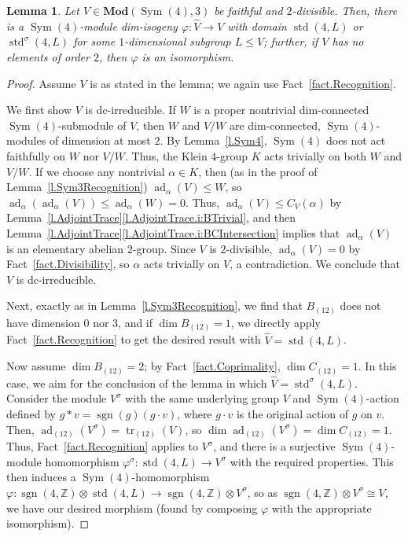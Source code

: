 \documentclass[a4paper, 11pt]{amsart}
\theoremstyle{plain}
\newtheorem{lemma}[theorem]{Lemma}
\theoremstyle{definition}
\theoremstyle{remark}
\DeclareMathOperator{\ad}{ad}
\DeclareMathOperator{\tr}{tr}
\DeclareMathOperator{\Sym}{Sym}
\DeclareMathOperator{\std}{std}
\DeclareMathOperator{\sgn}{sgn}
\newcommand{\Mod}{\mathbf{Mod}}
\newcommand{\bZ}{\mathbb{Z}}
\begin{document}
\begin{lemma}\label{l.Sym4Recognition}
Let $V\in \Mod(\Sym(4),3)$ be faithful and $2$-divisible. Then, there is a $\Sym(4)$-module dim-isogeny  $\varphi:\hat V\rightarrow V$ with domain $\std(4,L)$ or $\std^\sigma(4,L)$ for some $1$-dimensional subgroup $L\le V$;  further, if $V$ has no elements of order $2$, then $\varphi$ is an isomorphism.
\end{lemma}
\begin{proof}
Assume $V$ is as stated in the lemma; we again use Fact~\ref{fact.Recognition}.

We first  show  $V$ is dc-irreducible. If $W$ is a proper nontrivial dim-connected $\Sym(4)$-submodule of $V$, then $W$ and $V/W$ are dim-connected, $\Sym(4)$-modules of dimension at most $2$. By Lemma~\ref{l.Sym4}, $\Sym(4)$ does not act faithfully on $W$ nor $V/W$. Thus, the Klein $4$-group $K$ acts trivially on both $W$ and $V/W$. If we choose any nontrivial $\alpha \in K$, then (as in the proof of Lemma~\ref{l.Sym3Recognition}) $\ad_\alpha(V) \le W$, so   $\ad_\alpha(\ad_\alpha(V)) \le\ad_\alpha(W) =0$. Thus, $\ad_\alpha(V) \le C_V(\alpha)$ by Lemma~\ref{l.AdjointTrace}\eqref{l.AdjointTrace.i:BTrivial}, and then Lemma~\ref{l.AdjointTrace}\eqref{l.AdjointTrace.i:BCIntersection} implies that $\ad_\alpha(V)$ is an elementary abelian $2$-group. Since $V$ is $2$-divisible, $\ad_\alpha(V)=0$ by Fact~\ref{fact.Divisibility}, so $\alpha$ acts trivially on $V$, a contradiction. We conclude that $V$ is dc-irreducible.

Next, exactly as in  Lemma~\ref{l.Sym3Recognition}, we find that $B_{(12)}$ does not have dimension $0$ nor $3$, and if $\dim B_{(12)} = 1$, we directly apply Fact~\ref{fact.Recognition} to get the desired result with $\hat V=\std(4,L)$. 

Now assume $\dim B_{(12)} = 2$; by Fact~\ref{fact.Coprimality},  $\dim C_{(12)} = 1$. In this case, we aim for the conclusion of the lemma in which $\hat V=\std^\sigma(4,L)$.
Consider the module $V^\sigma$ with the same underlying group $V$ and $\Sym(4)$-action defined by $g*v = \sgn(g)(g\cdot v)$, where $g\cdot v$ is the original action of $g$ on $v$. Then, $\ad_{(12)}(V^\sigma) = \tr_{(12)}(V)$, so $\dim \ad_{(12)}(V^\sigma) = \dim C_{(12)} = 1$. Thus, Fact~\ref{fact.Recognition} applies to $V^\sigma$, and there is  a surjective $\Sym(4)$-module homomorphism $\varphi^\sigma:\std(4,L)\rightarrow V^\sigma$ with the required properties. This then induces a $\Sym(4)$-homomorphism $\varphi:\sgn(4,\bZ)\otimes\std(4,L)\rightarrow \sgn(4,\bZ)\otimes V^\sigma$, so as $\sgn(4,\bZ)\otimes V^\sigma \cong V$, we have our desired morphism (found by composing $\varphi$ with the appropriate isomorphism).
\end{proof}
\end{document}
